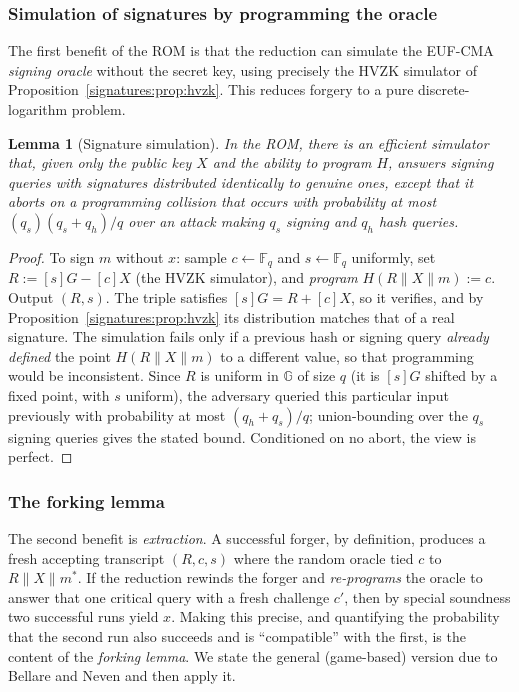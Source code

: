 \documentclass[11pt,a4paper]{article}
\newtheorem{lemma}[theorem]{Lemma}
\theoremstyle{definition}
\theoremstyle{remark}
\newcommand{\G}{\ensuremath{\mathbb{G}}}
\newcommand{\Fq}{\ensuremath{\mathbb{F}_{q}}}
\begin{document}
\subsubsection{Simulation of signatures by programming the oracle}\label{signatures:subsubsec:simulate}

The first benefit of the ROM is that the reduction can simulate the EUF-CMA \emph{signing oracle} without the secret key, using precisely the HVZK simulator of Proposition~\ref{signatures:prop:hvzk}. This reduces forgery to a pure discrete-logarithm problem.

\begin{lemma}[Signature simulation]\label{signatures:lem:simulate}
In the ROM, there is an efficient simulator that, given only the public key \(X\) and the ability to program \(H\), answers signing queries with signatures distributed identically to genuine ones, except that it aborts on a programming collision that occurs with probability at most \((q_s)(q_s+q_h)/q\) over an attack making \(q_s\) signing and \(q_h\) hash queries.
\end{lemma}

\begin{proof}
To sign \(m\) without \(x\): sample \(c \gets \Fq\) and \(s \gets \Fq\) uniformly, set \(R := [s]G - [c]X\) (the HVZK simulator), and \emph{program} \(H(R\|X\|m) := c\). Output \((R, s)\). The triple satisfies \([s]G = R + [c]X\), so it verifies, and by Proposition~\ref{signatures:prop:hvzk} its distribution matches that of a real signature. The simulation fails only if a previous hash or signing query \emph{already defined} the point \(H(R\|X\|m)\) to a different value, so that programming would be inconsistent. Since \(R\) is uniform in \(\G\) of size \(q\) (it is \([s]G\) shifted by a fixed point, with \(s\) uniform), the adversary queried this particular input previously with probability at most \((q_h + q_s)/q\); union-bounding over the \(q_s\) signing queries gives the stated bound. Conditioned on no abort, the view is perfect.
\end{proof}

\subsubsection{The forking lemma}\label{signatures:subsubsec:forking}

The second benefit is \emph{extraction}. A successful forger, by definition, produces a fresh accepting transcript \((R, c, s)\) where the random oracle tied \(c\) to \(R\| X\| m^\ast\). If the reduction rewinds the forger and \emph{re-programs} the oracle to answer that one critical query with a fresh challenge \(c'\), then by special soundness two successful runs yield \(x\). Making this precise, and quantifying the probability that the second run also succeeds and is ``compatible'' with the first, is the content of the \emph{forking lemma}. We state the general (game-based) version due to Bellare and Neven and then apply it.
\end{document}

